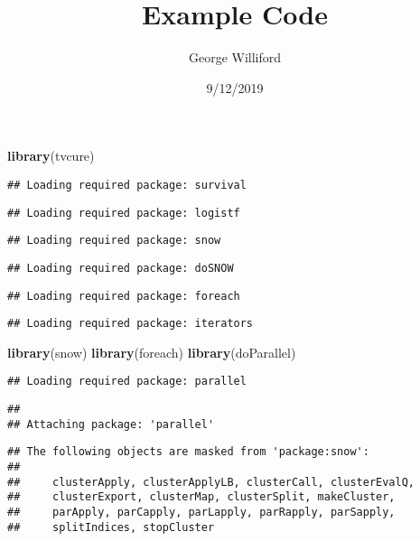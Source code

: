 \documentclass[]{article}
\title{Example Code}
\author{George Williford}
\date{9/12/2019}
\newenvironment{Shaded}{\begin{snugshade}}{\end{snugshade}}
\newcommand{\KeywordTok}[1]{\textcolor[rgb]{0.13,0.29,0.53}{\textbf{#1}}}
\newcommand{\NormalTok}[1]{#1}
\begin{document}
\maketitle

\begin{Shaded}
\begin{Highlighting}[]
\KeywordTok{library}\NormalTok{(tvcure)}
\end{Highlighting}
\end{Shaded}

\begin{verbatim}
## Loading required package: survival
\end{verbatim}

\begin{verbatim}
## Loading required package: logistf
\end{verbatim}

\begin{verbatim}
## Loading required package: snow
\end{verbatim}

\begin{verbatim}
## Loading required package: doSNOW
\end{verbatim}

\begin{verbatim}
## Loading required package: foreach
\end{verbatim}

\begin{verbatim}
## Loading required package: iterators
\end{verbatim}

\begin{Shaded}
\begin{Highlighting}[]
\KeywordTok{library}\NormalTok{(snow)}
\KeywordTok{library}\NormalTok{(foreach)}
\KeywordTok{library}\NormalTok{(doParallel)}
\end{Highlighting}
\end{Shaded}

\begin{verbatim}
## Loading required package: parallel
\end{verbatim}

\begin{verbatim}
## 
## Attaching package: 'parallel'
\end{verbatim}

\begin{verbatim}
## The following objects are masked from 'package:snow':
## 
##     clusterApply, clusterApplyLB, clusterCall, clusterEvalQ,
##     clusterExport, clusterMap, clusterSplit, makeCluster,
##     parApply, parCapply, parLapply, parRapply, parSapply,
##     splitIndices, stopCluster
\end{verbatim}
\end{document}
